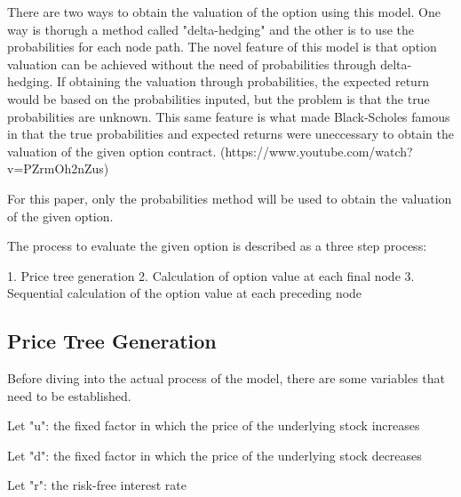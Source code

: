 \documentclass[12pt, letterpaper]{article}
\begin{document}
There are two ways to obtain the valuation of the option using this model.
One way is thorugh a method called "delta-hedging" and the other is to use the probabilities for each node path.
The novel feature of this model is that option valuation can be achieved without the need of probabilities through delta-hedging.
If obtaining the valuation through probabilities, the expected return would be based on the probabilities inputed, but the problem is that the true probabilities are unknown.
This same feature is what made Black-Scholes famous in that the true probabilities and expected returns were uneccessary to obtain the valuation of the given option contract. (https://www.youtube.com/watch?v=PZrmOh2nZus)

For this paper, only the probabilities method will be used to obtain the valuation of the given option. 

The process to evaluate the given option is described as a three step process: %

1. Price tree generation
2. Calculation of option value at each final node
3. Sequential calculation of the option value at each preceding node

\subsection{Price Tree Generation}
Before diving into the actual process of the model, there are some variables that need to be established.

Let "u": the fixed factor in which the price of the underlying stock increases

Let "d": the fixed factor in which the price of the underlying stock decreases

Let "r": the risk-free interest rate %
\end{document}
